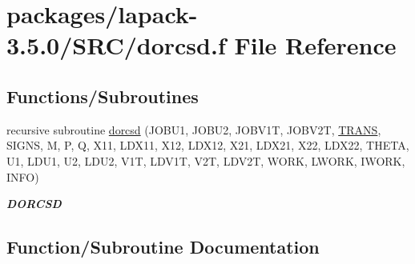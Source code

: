 \hypertarget{dorcsd_8f}{}\section{packages/lapack-\/3.5.0/\+S\+R\+C/dorcsd.f File Reference}
\label{dorcsd_8f}
\subsection*{Functions/\+Subroutines}
\begin{DoxyCompactItemize}
\item 
recursive subroutine \hyperlink{dorcsd_8f_a36c8c415a8b62b6f501ce5a99b69bfb1}{dorcsd} (J\+O\+B\+U1, J\+O\+B\+U2, J\+O\+B\+V1\+T, J\+O\+B\+V2\+T, \hyperlink{superlu__enum__consts_8h_a0c4e17b2d5cea33f9991ccc6a6678d62a1f61e3015bfe0f0c2c3fda4c5a0cdf58}{T\+R\+A\+N\+S}, S\+I\+G\+N\+S, M, P, Q, X11, L\+D\+X11, X12, L\+D\+X12, X21, L\+D\+X21, X22, L\+D\+X22, T\+H\+E\+T\+A, U1, L\+D\+U1, U2, L\+D\+U2, V1\+T, L\+D\+V1\+T, V2\+T, L\+D\+V2\+T, W\+O\+R\+K, L\+W\+O\+R\+K, I\+W\+O\+R\+K, I\+N\+F\+O)
\begin{DoxyCompactList}\small\item\em {\bfseries D\+O\+R\+C\+S\+D} \end{DoxyCompactList}\end{DoxyCompactItemize}


\subsection{Function/\+Subroutine Documentation}
\hypertarget{dorcsd_8f_a36c8c415a8b62b6f501ce5a99b69bfb1}{}

